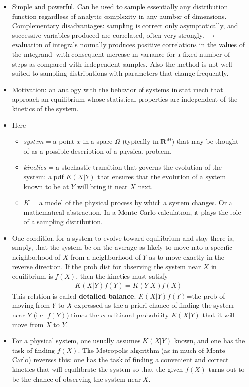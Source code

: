 \documentclass[twoside,english]{uiofysmaster}
\begin{document}
\begin{itemize}
	\item Simple and powerful. Can be used to sample essentially any distribution function regardless of analytic complexity in any number of dimensions. Complementary disadvantages: sampling is correct only asymptotically, and successive variables produced are correlated, often very strongly. $\rightarrow$ evaluation of integrals normally produces positive correlations in the values of the integrand, with consequent increase in variance for a fixed number of steps as compared with independent samples. Also the method is not well suited to sampling distributions with parameters that change frequently.
	\item Motivation: an analogy with the behavior of systems in stat mech that approach an equilibrium whose statistical properties are independent of the kinetics of the system.
	\item Here
	\begin{itemize}
		\item \textit{system} = a point $x$ in a space $\Omega$ (typically in $\bm{R}^M$) that may be thought of as a possible description of a physical problem.
		\item \textit{kinetics} = a stochastic transition that governs the evolution of the system: a pdf $K(X|Y)$ that ensures that the evolution of a system known to be at $Y$ will bring it near $X$ next.
		\item $K$ = a model of the physical process by which a system changes. Or a mathematical abstraction. In a Monte Carlo calculation, it plays the role of a sampling distribution.
	\end{itemize}
	\item One condition for a system to evolve toward equilibrium and stay there is, simply, that the system be on the average as likely to move into a specific neighborhood of $X$ from a neighborhood of $Y$ as to move exactly in the reverse direction. If the prob dist for observing the system near $X$ in equilibrium is $f(X)$, then the kinetics must satisfy
	\begin{align}
		K(X|Y) f(Y) = K(Y|X)f(X)
	\end{align}
	This relation is called \textbf{detailed balance}. $K(X|Y)f(Y)$=the prob of moving from $Y$ to $X$ expressed as the a priori chance of finding the system near $Y$ (i.e. $f(Y)$) times the conditional probability $K(X|Y)$ that it will move from $X$ to $Y$.
	\item For a physical system, one usually assumes $K(X|Y)$ known, and one has the task of finding $f(X)$. The Metropolis algorithm  (as in much of Monte Carlo) reverses this: one has the task of finding a convenient and correct kinetics that will equilibrate the system so that the given $f(X)$ turns out to be the chance of observing the system near $X$.

\end{itemize}
\end{document}
